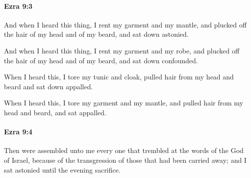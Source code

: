 		\paragraph{Ezra 9:3} %
			\label{EZRA-9-3}

			And when I heard this thing, I rent my garment and my mantle, and plucked off the hair of my head and of my beard, and sat down astonied.

			\begin{versebox}
					\item[BHS] 
					\item[LXX] 
					\item[ASV] And when I heard this thing, I rent my garment and my robe, and plucked off the hair of my head and of my beard, and sat down confounded.
					\item[NIV] When I heard this, I tore my tunic and cloak, pulled hair from my head and beard and sat down appalled.
					\item[NRSV] When I heard this, I tore my garment and my mantle, and pulled hair from my head and beard, and sat appalled.
			\end{versebox}

		\paragraph{Ezra 9:4} %
			\label{EZRA-9-4}

			Then were assembled unto me every one that trembled at the words of the God of Israel, because of the transgression of those that had been carried away; and I sat astonied until the evening sacrifice.

